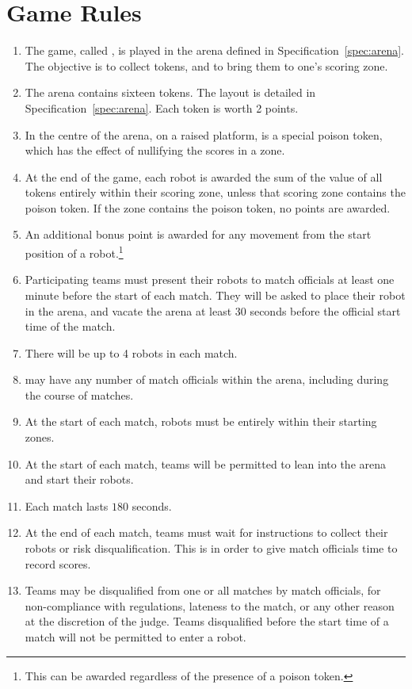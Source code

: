 \section{Game Rules}
\label{sec:rules}

\begin{enumerate}
  \item The game, called \emph{\gamename}, is played in the arena defined in
        Specification~\ref{spec:arena}. The objective is to collect tokens, and
        to bring them to one's scoring zone.
  \item The arena contains sixteen tokens. The layout is detailed in
        Specification~\ref{spec:arena}. Each token is worth 2 points.
  \item In the centre of the arena, on a raised platform, is a special poison
        token, which has the effect of nullifying the scores in a zone.
  \item At the end of the game, each robot is awarded the sum of the value of
        all tokens entirely within their scoring zone, unless that scoring zone
        contains the poison token. If the zone contains the poison token, no
        points are awarded.
  \item An additional bonus point is awarded for any movement from the start
        position of a robot.\footnote{This can be awarded regardless of the
        presence of a poison token.}
  \item Participating teams must present their robots to match officials at
        least one minute before the start of each match. They will be asked to
        place their robot in the arena, and vacate the arena at least 30 seconds
        before the official start time of the match.
  \item There will be up to 4 robots in each match.
  \item \org may have any number of match officials within the arena, including
        during the course of matches.
  \item At the start of each match, robots must be entirely within their
        starting zones.
  \item At the start of each match, teams will be permitted to lean into the
        arena and start their robots.
  \item Each match lasts $180$ seconds.
  \item At the end of each match, teams must wait for instructions to collect
        their robots or risk disqualification. This is in order to give match
        officials time to record scores.
  \item Teams may be disqualified from one or all matches by match officials,
        for non-compliance with regulations, lateness to the match, or any other
        reason at the discretion of the judge. Teams disqualified before the
        start time of a match will not be permitted to enter a robot.
\end{enumerate}

